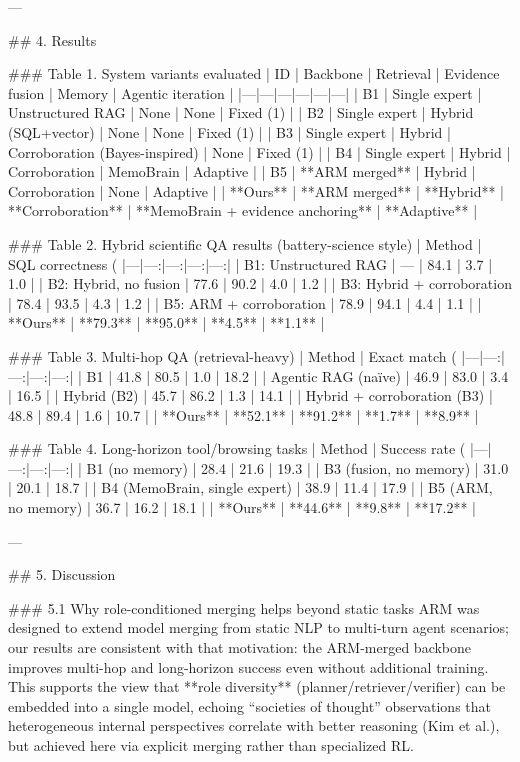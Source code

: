 ---

## 4. Results  

### Table 1. System variants evaluated  
| ID | Backbone | Retrieval | Evidence fusion | Memory | Agentic iteration |
|---|---|---|---|---|---|
| B1 | Single expert | Unstructured RAG | None | None | Fixed (1) |
| B2 | Single expert | Hybrid (SQL+vector) | None | None | Fixed (1) |
| B3 | Single expert | Hybrid | Corroboration (Bayes-inspired) | None | Fixed (1) |
| B4 | Single expert | Hybrid | Corroboration | MemoBrain | Adaptive |
| B5 | **ARM merged** | Hybrid | Corroboration | None | Adaptive |
| **Ours** | **ARM merged** | **Hybrid** | **Corroboration** | **MemoBrain + evidence anchoring** | **Adaptive** |

### Table 2. Hybrid scientific QA results (battery-science style)  
| Method | SQL correctness (%
|---|---:|---:|---:|---:|
| B1: Unstructured RAG | — | 84.1 | 3.7 | 1.0 |
| B2: Hybrid, no fusion | 77.6 | 90.2 | 4.0 | 1.2 |
| B3: Hybrid + corroboration | 78.4 | 93.5 | 4.3 | 1.2 |
| B5: ARM + corroboration | 78.9 | 94.1 | 4.4 | 1.1 |
| **Ours** | **79.3** | **95.0** | **4.5** | **1.1** |

### Table 3. Multi-hop QA (retrieval-heavy)  
| Method | Exact match (%
|---|---:|---:|---:|---:|
| B1 | 41.8 | 80.5 | 1.0 | 18.2 |
| Agentic RAG (naïve) | 46.9 | 83.0 | 3.4 | 16.5 |
| Hybrid (B2) | 45.7 | 86.2 | 1.3 | 14.1 |
| Hybrid + corroboration (B3) | 48.8 | 89.4 | 1.6 | 10.7 |
| **Ours** | **52.1** | **91.2** | **1.7** | **8.9** |

### Table 4. Long-horizon tool/browsing tasks  
| Method | Success rate (%
|---|---:|---:|---:|
| B1 (no memory) | 28.4 | 21.6 | 19.3 |
| B3 (fusion, no memory) | 31.0 | 20.1 | 18.7 |
| B4 (MemoBrain, single expert) | 38.9 | 11.4 | 17.9 |
| B5 (ARM, no memory) | 36.7 | 16.2 | 18.1 |
| **Ours** | **44.6** | **9.8** | **17.2** |

---

## 5. Discussion  

### 5.1 Why role-conditioned merging helps beyond static tasks  
ARM was designed to extend model merging from static NLP to multi-turn agent scenarios; our results are consistent with that motivation: the ARM-merged backbone improves multi-hop and long-horizon success even without additional training. This supports the view that **role diversity** (planner/retriever/verifier) can be embedded into a single model, echoing “societies of thought” observations that heterogeneous internal perspectives correlate with better reasoning (Kim et al.), but achieved here via explicit merging rather than specialized RL.

